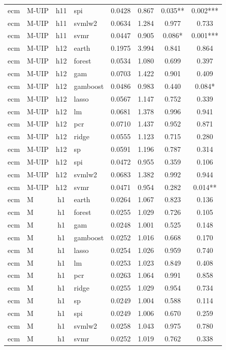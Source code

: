 \begin{ThreePartTable}
\begin{longtable}[t]{llclcccc}
ecm & M-UIP & h11 & spi & 0.0428 & 0.867 & 0.035** & 0.002***\\
ecm & M-UIP & h11 & svmlw2 & 0.0634 & 1.284 & 0.977 & 0.733\\
ecm & M-UIP & h11 & svmr & 0.0447 & 0.905 & 0.086* & 0.001***\\
\addlinespace
ecm & M-UIP & h12 & earth & 0.1975 & 3.994 & 0.841 & 0.864\\
ecm & M-UIP & h12 & forest & 0.0534 & 1.080 & 0.699 & 0.397\\
ecm & M-UIP & h12 & gam & 0.0703 & 1.422 & 0.901 & 0.409\\
ecm & M-UIP & h12 & gamboost & 0.0486 & 0.983 & 0.440 & 0.084*\\
ecm & M-UIP & h12 & lasso & 0.0567 & 1.147 & 0.752 & 0.339\\
ecm & M-UIP & h12 & lm & 0.0681 & 1.378 & 0.996 & 0.941\\
ecm & M-UIP & h12 & pcr & 0.0710 & 1.437 & 0.952 & 0.871\\
ecm & M-UIP & h12 & ridge & 0.0555 & 1.123 & 0.715 & 0.280\\
ecm & M-UIP & h12 & sp & 0.0591 & 1.196 & 0.787 & 0.314\\
ecm & M-UIP & h12 & spi & 0.0472 & 0.955 & 0.359 & 0.106\\
ecm & M-UIP & h12 & svmlw2 & 0.0683 & 1.382 & 0.992 & 0.944\\
ecm & M-UIP & h12 & svmr & 0.0471 & 0.954 & 0.282 & 0.014**\\
\addlinespace
ecm & M & h1 & earth & 0.0264 & 1.067 & 0.823 & 0.136\\
ecm & M & h1 & forest & 0.0255 & 1.029 & 0.726 & 0.105\\
ecm & M & h1 & gam & 0.0248 & 1.001 & 0.525 & 0.148\\
ecm & M & h1 & gamboost & 0.0252 & 1.016 & 0.668 & 0.170\\
ecm & M & h1 & lasso & 0.0254 & 1.026 & 0.959 & 0.740\\
ecm & M & h1 & lm & 0.0253 & 1.023 & 0.849 & 0.408\\
ecm & M & h1 & pcr & 0.0263 & 1.064 & 0.991 & 0.858\\
ecm & M & h1 & ridge & 0.0255 & 1.029 & 0.954 & 0.734\\
ecm & M & h1 & sp & 0.0249 & 1.004 & 0.588 & 0.114\\
ecm & M & h1 & spi & 0.0249 & 1.006 & 0.670 & 0.259\\
ecm & M & h1 & svmlw2 & 0.0258 & 1.043 & 0.975 & 0.780\\
ecm & M & h1 & svmr & 0.0252 & 1.019 & 0.762 & 0.338\\

\end{longtable}
\end{ThreePartTable}
